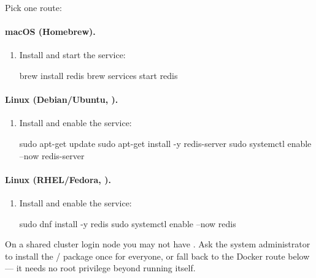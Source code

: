 Pick one route:

\paragraph{macOS (Homebrew).}
\begin{enumerate}
  \item Install and start the service:
\begin{terminal}
\begin{jcmd}
brew install redis
brew services start redis
\end{jcmd}
\end{terminal}
\end{enumerate}

\paragraph{Linux (Debian/Ubuntu, ).}
\begin{enumerate}
  \item Install and enable the service:
\begin{terminal}
\begin{jcmd}
sudo apt-get update
sudo apt-get install -y redis-server
sudo systemctl enable --now redis-server
\end{jcmd}
\end{terminal}
\end{enumerate}

\paragraph{Linux (RHEL/Fedora, ).}
\begin{enumerate}
  \item Install and enable the service:
\begin{terminal}
\begin{jcmd}
sudo dnf install -y redis
sudo systemctl enable --now redis
\end{jcmd}
\end{terminal}
\end{enumerate}

\begin{jnote}
On a shared cluster login node you may not have . Ask the system
administrator to install the / package once for
everyone, or fall back to the Docker route below --- it needs no root privilege beyond
running  itself.
\end{jnote}

